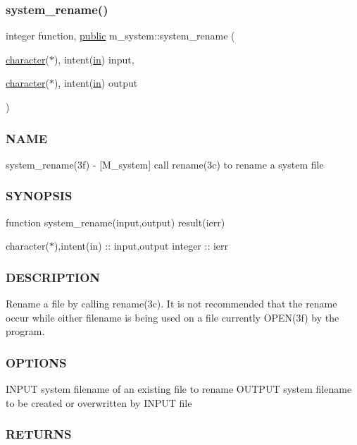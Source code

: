 \subsubsection{\texorpdfstring{system\+\_\+rename()}{system\_rename()}}
{\footnotesize\ttfamily integer function, \hyperlink{M__stopwatch_83_8txt_a2f74811300c361e53b430611a7d1769f}{public} m\+\_\+system\+::system\+\_\+rename (\begin{DoxyParamCaption}\item[{\hyperlink{option__stopwatch_83_8txt_abd4b21fbbd175834027b5224bfe97e66}{character}($\ast$), intent(\hyperlink{M__journal_83_8txt_afce72651d1eed785a2132bee863b2f38}{in})}]{input,  }\item[{\hyperlink{option__stopwatch_83_8txt_abd4b21fbbd175834027b5224bfe97e66}{character}($\ast$), intent(\hyperlink{M__journal_83_8txt_afce72651d1eed785a2132bee863b2f38}{in})}]{output }\end{DoxyParamCaption})}



\subsubsection*{N\+A\+ME}

system\+\_\+rename(3f) -\/ \mbox{[}M\+\_\+system\mbox{]} call rename(3c) to rename a system file \subsubsection*{S\+Y\+N\+O\+P\+S\+IS}

function system\+\_\+rename(input,output) result(ierr)

character($\ast$),intent(in) \+:\+: input,output integer \+:\+: ierr \subsubsection*{D\+E\+S\+C\+R\+I\+P\+T\+I\+ON}

Rename a file by calling rename(3c). It is not recommended that the rename occur while either filename is being used on a file currently O\+P\+E\+N(3f) by the program. \subsubsection*{O\+P\+T\+I\+O\+NS}

I\+N\+P\+UT system filename of an existing file to rename O\+U\+T\+P\+UT system filename to be created or overwritten by I\+N\+P\+UT file \subsubsection*{R\+E\+T\+U\+R\+NS}


